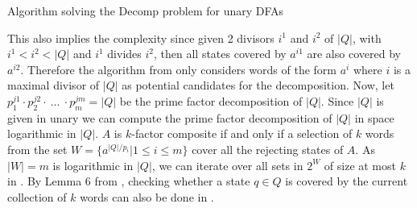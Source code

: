 \begin{algorithm}[H]
	\label{algo:original-composite}
	\DontPrintSemicolon
		
		
		
		\caption{\LogSpace Algorithm solving the Decomp problem for unary DFAs}
\end{algorithm}

This also implies the complexity since given 2 divisors $i^1$ and $i^2$ of $|Q|$, with $i^1 < i^2 <|Q|$ and $i^1$ divides $i^2$, then all states covered by $a^{i1}$ are also covered by $a^{i2}$. Therefore the algorithm from \cite{DBLP:journals/corr/abs-2107-04683} only considers words of the form $a^i$ where $i$ is a maximal divisor of $|Q|$ as potential candidates for the decomposition. Now, let $p_1^{j1} \cdot p_2^{j2} \cdot ~ \dots ~\cdot p_m^{jm} = |Q|$ be the prime factor decomposition of $|Q|$. Since $|Q|$ is given in unary we can compute the prime factor decomposition of $|Q|$ in space logarithmic in $|Q|$. $A$ is $k$-factor composite if and only if a selection of $k$ words from the set $W = \{a^{|Q|/p_i} | 1 \leq i \leq m\}$ cover all the rejecting states of $A$.  As $|W| = m$ is logarithmic in $|Q|$, we can iterate over all sets in $2^W$ of size at most $k$ in \LogSpace. By Lemma 6 from \cite{DBLP:journals/corr/abs-2107-04683}, checking whether a state $q \in Q$ is covered by the current collection of $k$ words can also be done in \LogSpace.





